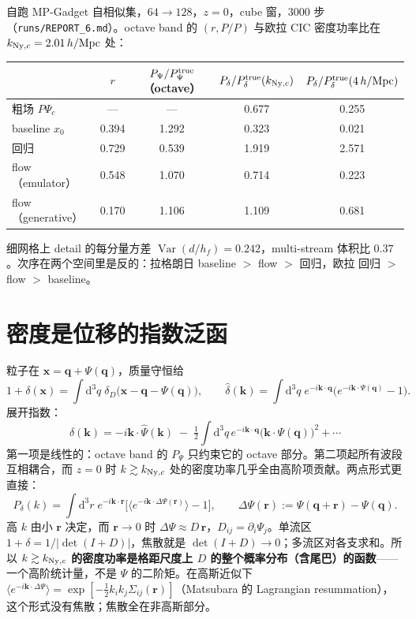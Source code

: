 \documentclass[11pt,UTF8,fontset=none]{ctexart}
\newcommand{\q}{\mathbf{q}}
\newcommand{\kk}{\mathbf{k}}
\newcommand{\x}{\mathbf{x}}
\newcommand{\rr}{\mathbf{r}}
\newcommand{\dd}{\mathrm{d}}
\newcommand{\Var}{\operatorname{Var}}
\newcommand{\Ny}{{\rm Ny}}
\newcommand{\Pd}{P_\delta}
\newcommand{\Psic}{\Psi_c}
\begin{document}
自跑 MP-Gadget 自相似集，$64\to128$，$z=0$，cube 窗，3000 步（\texttt{runs/REPORT\_6.md}）。octave band 的 $(r,P/P)$ 与欧拉 CIC 密度功率比在 $k_{\Ny,c}=2.01\,h/{\rm Mpc}$ 处：
\begin{center}
\begin{tabular}{lcccc}
\toprule
 & $r$ & $P_\Psi/P_\Psi^{\rm true}$（octave） & $\Pd/\Pd^{\rm true}(k_{\Ny,c})$ & $\Pd/\Pd^{\rm true}(4\,h/{\rm Mpc})$\\
\midrule
粗场 $P\Psic$ & — & — & 0.677 & 0.255\\
baseline $x_0$ & 0.394 & 1.292 & 0.323 & 0.021\\
回归 & 0.729 & 0.539 & 1.919 & 2.571\\
flow（emulator） & 0.548 & 1.070 & 0.714 & 0.223\\
flow（generative） & 0.170 & 1.106 & 1.109 & 0.681\\
\bottomrule
\end{tabular}
\end{center}
细网格上 detail 的每分量方差 $\Var(d/h_f)=0.242$，multi-stream 体积比 $0.37$。次序在两个空间里是反的：拉格朗日 baseline $>$ flow $>$ 回归，欧拉 回归 $>$ flow $>$ baseline。

\section{密度是位移的指数泛函}

粒子在 $\x=\q+\Psi(\q)$，质量守恒给
\begin{equation}
1+\delta(\x)=\int\dd^3q\;\delta_D\big(\x-\q-\Psi(\q)\big),\qquad
\hat\delta(\kk)=\int\dd^3q\;e^{-i\kk\cdot\q}\big(e^{-i\kk\cdot\Psi(\q)}-1\big).
\label{eq:delta}
\end{equation}
展开指数：
\begin{equation}
\hat\delta(\kk)=-i\kk\cdot\hat\Psi(\kk)\;-\;\tfrac12\int\dd^3q\,e^{-i\kk\cdot\q}\big(\kk\cdot\Psi(\q)\big)^2+\cdots
\end{equation}
第一项是线性的：octave band 的 $P_\Psi$ 只约束它的 octave 部分。第二项起所有波段互相耦合，而 $z=0$ 时 $k\gtrsim k_{\Ny,c}$ 处的密度功率几乎全由高阶项贡献。两点形式更直接：
\begin{equation}
\Pd(k)=\int\dd^3r\;e^{-i\kk\cdot\rr}\Big[\big\langle e^{-i\kk\cdot\Delta\Psi(\rr)}\big\rangle-1\Big],\qquad
\Delta\Psi(\rr):=\Psi(\q+\rr)-\Psi(\q).
\label{eq:twopoint}
\end{equation}
高 $k$ 由小 $\rr$ 决定，而 $\rr\to0$ 时 $\Delta\Psi\approx D\,\rr$，$D_{ij}=\partial_i\Psi_j$。单流区 $1+\delta=1/|\det(I+D)|$，焦散就是 $\det(I+D)\to0$；多流区对各支求和。所以 \textbf{$k\gtrsim k_{\Ny,c}$ 的密度功率是格距尺度上 $D$ 的整个概率分布（含尾巴）的函数}——一个高阶统计量，不是 $\Psi$ 的二阶矩。在高斯近似下 $\langle e^{-i\kk\cdot\Delta\Psi}\rangle=\exp[-\tfrac12k_ik_j\Sigma_{ij}(\rr)]$（Matsubara 的 Lagrangian resummation），这个形式没有焦散；焦散全在非高斯部分。
\end{document}
